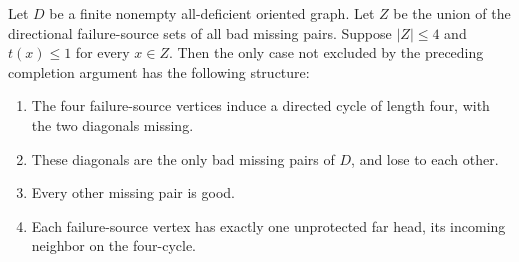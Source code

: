 \begin{proposition}\label{prop:four-unit-cycle-reduction}
Let $D$ be a finite nonempty all-deficient oriented graph.
Let $Z$ be the union of the directional failure-source sets of all
bad missing pairs. Suppose $|Z|\le4$ and $t(x)\le1$ for every $x\in Z$.
Then the only case not excluded by the preceding completion argument
has the following structure:
\begin{enumerate}
\item The four failure-source vertices induce a directed cycle of
length four, with the two diagonals missing.
\item These diagonals are the only bad missing pairs of $D$, and lose
to each other.
\item Every other missing pair is good.
\item Each failure-source vertex has exactly one unprotected far
head, its incoming neighbor on the four-cycle.
\end{enumerate}
\end{proposition}
